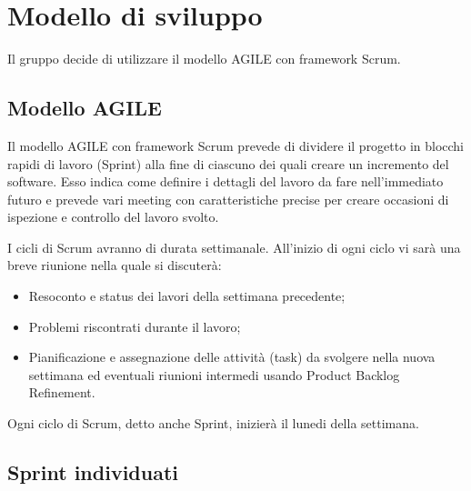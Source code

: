 \section{Modello di sviluppo}
Il gruppo decide di utilizzare il modello AGILE con framework Scrum.

\subsection{Modello AGILE}
Il modello AGILE con framework Scrum prevede di dividere il progetto in blocchi rapidi di lavoro (Sprint) 
alla fine di ciascuno dei quali creare un incremento del software. 
Esso indica come definire i dettagli del lavoro da fare nell'immediato futuro e prevede 
vari meeting con caratteristiche precise per creare occasioni di ispezione e controllo del lavoro svolto.

I cicli di Scrum avranno di durata settimanale. All'inizio di ogni ciclo vi sarà una breve riunione nella quale si discuterà:
\begin{itemize}
	\item Resoconto e status dei lavori della settimana precedente;
	\item Problemi riscontrati durante il lavoro;
	\item Pianificazione e assegnazione delle attività (task) da svolgere nella nuova settimana ed eventuali riunioni intermedi usando Product Backlog Refinement.
\end{itemize}
Ogni ciclo di Scrum, detto anche Sprint, inizierà il lunedi della settimana.

\subsection{Sprint individuati}